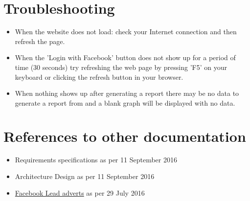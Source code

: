 \documentclass{article}
\begin{document}
	\section{Troubleshooting}
		\begin{itemize}
			\item When the website does not load: check your Internet connection and then refresh the page.
			\item When the 'Login with Facebook' button does not show up for a period of time (30 seconds) try refreshing the web page by pressing 'F5' on your keyboard or clicking the refresh button in your browser.
			\item When nothing shows up after generating a report there may be no data to generate a report from and a blank graph will be displayed with no data.
		\end{itemize}

	\section{References to other documentation}
		\begin{itemize}
			\item{Requirements specifications as per 11 September 2016}
			\item{Architecture Design as per 11 September 2016}
			\item{\href{https://www.facebook.com/business/a/lead-ads}{Facebook Lead adverts} as per 29 July 2016}
		\end{itemize}
\end{document}
